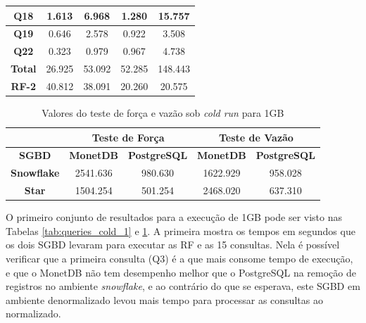 \begin{table}[htpb]
\begin{tabular}{|c|c|c|c|c|}
        \textbf{Q18}   & 1.613             & 6.968               & 1.280          & 15.757            \\ \hline
        \textbf{Q19}   & 0.646             & 2.578               & 0.922          & 3.508             \\ \hline
        \textbf{Q22}   & 0.323             & 0.979               & 0.967          & 4.738             \\ \hline
        \textbf{Total} & 26.925            & 53.092              & 52.285         & 148.443           \\ \hline
        \textbf{RF-2}  & 40.812            & 38.091              & 20.260         & 20.575            \\ \hline
        \end{tabular}
        \end{table}

\begin{table}[htpb]
        \centering
        \caption{Valores do teste de força e vazão sob \textit{cold run} para 1GB}
        \label{tab:forca_vazao_cold_1}
        \begin{tabular}{|c|c|c|c|c|}
        \hline
                                & \multicolumn{2}{c|}{\textbf{Teste de Força}} & \multicolumn{2}{c|}{\textbf{Teste de Vazão}} \\ \hline
        \textbf{SGBD}      & \textbf{MonetDB}    & \textbf{PostgreSQL}    & \textbf{MonetDB}    & \textbf{PostgreSQL}    \\ \hline
        \textbf{Snowflake} & 2541.636            & 980.630                & 1622.929            & 958.028                \\ \hline
        \textbf{Star}      & 1504.254            & 501.254                & 2468.020            & 637.310                \\ \hline
        \end{tabular}
\end{table}

O primeiro conjunto de resultados para a execução de 1GB pode ser visto nas Tabelas \ref{tab:queries_cold_1} e \ref{tab:forca_vazao_cold_1}. A primeira mostra os tempos em segundos que os dois SGBD levaram para executar as RF e as 15 consultas. Nela é possível verificar que a primeira consulta (Q3) é a que mais consome tempo de execução, e que o MonetDB não tem desempenho melhor que o PostgreSQL na remoção de registros no ambiente \textit{snowflake}, e ao contrário do que se esperava, este SGBD em ambiente denormalizado levou mais tempo para processar as consultas ao normalizado. 



